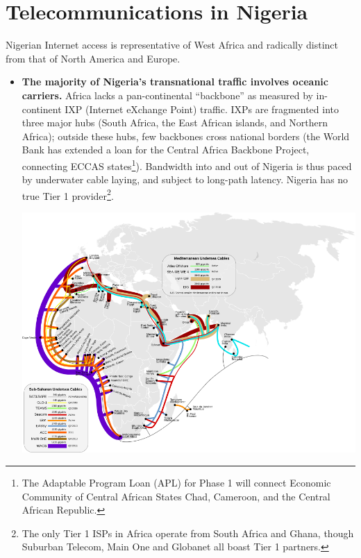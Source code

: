 \documentclass[]{sigplanconf}
\begin{document}
\section{Telecommunications in Nigeria}
Nigerian Internet access is representative of West Africa and radically
distinct from that of North America and Europe.
\begin{itemize}
\item	\textbf{The majority of Nigeria's transnational traffic involves
	oceanic carriers.}
	Africa lacks a pan-continental ``backbone'' as measured by in-continent
	IXP (Internet eXchange Point) traffic\cite{pingdom}. IXPs are fragmented
	into three major hubs (South Africa, the East African islands, and
	Northern Africa); outside these hubs, few backbones cross national
	borders (the World Bank has extended a loan for the
	Central Africa Backbone Project, connecting ECCAS
	states\footnote{The Adaptable Program Loan (APL) for Phase 1 will
	connect Economic Community of Central African States Chad, Cameroon,
	and the Central African Republic\cite{apl1a}.}). Bandwidth
	into and out of Nigeria is thus paced by underwater cable laying, and
	subject to long-path latency. Nigeria has no true Tier 1 provider\footnote{The only
	Tier 1 ISPs in Africa operate from South Africa and Ghana\cite{drpeering}, though
	Suburban Telecom\cite{suburban}, Main One and Globanet all boast
	Tier 1 partners.}.
	
\includegraphics[scale=.4]{subsahara.png}


\end{itemize}
\end{document}

